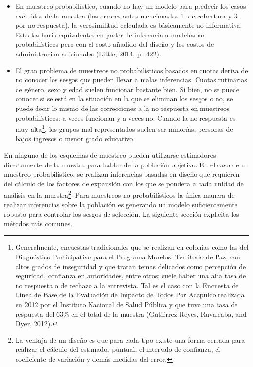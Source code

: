 \documentclass[]{article}
\let\rmarkdownfootnote\footnote%
\def\footnote{\protect\rmarkdownfootnote}
\begin{document}
\begin{itemize}
\itemsep1pt\parskip0pt
\item
  En muestreo probabilístico, cuando no hay un modelo para predecir los
  casos excluidos de la muestra (los errores antes mencionados 1. de
  cobertura y 3. por no respuesta), la verosimilitud calculada es
  básicamente no informativa. Esto los haría equivalentes en poder de
  inferencia a modelos no probabilísticos pero con el costo añadido del
  diseño y los costos de administración adicionales (Little, 2014,
  p.~422).
\item
  El gran problema de muestreos no probabilísticos basados en cuotas
  deriva de no conocer los sesgos que pueden llevar a malas inferencias.
  Cuotas rutinarias de género, sexo y edad suelen funcionar bastante
  bien. Si bien, no se puede conocer si se está en la situación en la
  que se eliminan los sesgos o no, se puede decir lo mismo de las
  correcciones a la no respuesta en muestreos probabilísticos: a veces
  funcionan y a veces no. Cuando la no respuesta es muy alta\footnote{Generalmente,
    encuestas tradicionales que se realizan en colonias como las del
    Diagnóstico Participativo para el Programa Morelos: Territorio de
    Paz, con altos grados de inseguridad y que tratan temas delicados
    como percepción de seguridad, confianza en autoridades, entre otros;
    suele haber una alta tasa de no respuesta o de rechazo a la
    entrevista. Tal es el caso con la Encuesta de Línea de Base de la
    Evaluación de Impacto de Todos Por Acapulco realizada en 2012 por el
    Instituto Nacional de Salud Pública y que tuvo una tasa de respuesta
    del 63\% en el total de la muestra (Gutiérrez Reyes, Ruvalcaba, and
    Dyer, 2012).}, los grupos mal representados suelen ser minorías,
  personas de bajos ingresos o menor grado educativo.
\end{itemize}

En ninguno de los esquemas de muestreo pueden utilizarse estimadores
directamente de la muestra para hablar de la población objetivo. En el
caso de un muestreo probabilístico, se realizan inferencias basadas en
diseño que requieren del cálculo de los factores de expansión con los
que se pondera a cada unidad de análisis en la muestra\footnote{La
  ventaja de un diseño es que para cada tipo existe una forma cerrada
  para realizar el cálculo del estimador puntual, el intervalo de
  confianza, el coeficiente de variación y demás medidas del error.}.
Para muestreos no probabilísticos la única manera de realizar
inferencias sobre la población es generando un modelo suficientemente
robusto para controlar los sesgos de selección. La siguiente sección
explicita los métodos más comunes.
\end{document}
